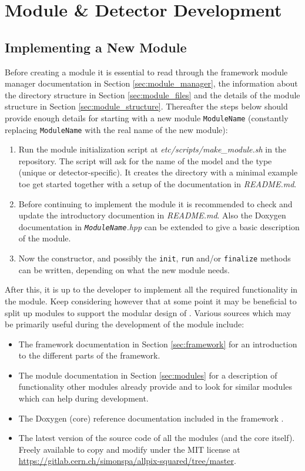 \section{Module \& Detector Development}
\subsection{Implementing a New Module}
\label{sec:building_new_module}

Before creating a module it is essential to read through the framework module manager documentation in Section \ref{sec:module_manager}, the information about the directory structure in Section \ref{sec:module_files} and the details of the module structure in Section \ref{sec:module_structure}. Thereafter the steps below should provide enough details for starting with a new module \texttt{ModuleName} (constantly replacing  \texttt{ModuleName} with the real name of the new module):
\begin{enumerate}
\item Run the module initialization script at \textit{etc/scripts/make\_module.sh} in the repository. The script will ask for the name of the model and the type (unique or detector-specific). It creates the directory with a minimal example toe get started together with a setup of the documentation in \textit{README.md}.
\item Before continuing to implement the module it is recommended to check and update the introductory documention in \textit{README.md}. Also the Doxygen documentation in \textit{\texttt{ModuleName}.hpp} can be extended to give a basic description of the module.
\item Now the constructor, and possibly the \texttt{init}, \texttt{run} and/or \texttt{finalize} methods can be written, depending on what the new module needs.
\end{enumerate}

After this, it is up to the developer to implement all the required functionality in the module. Keep considering however that at some point it may be beneficial to split up modules to support the modular design of \apsq. Various sources which may be primarily useful during the development of the module include:
\begin{itemize}
\item The framework documentation in Section \ref{sec:framework} for an introduction to the different parts of the framework.
\item The module documentation in Section \ref{sec:modules} for a description of functionality other modules already provide and to look for similar modules which can help during development.
\item The Doxygen (core) reference documentation included in the framework .
\item The latest version of the source code of all the modules (and the core itself). Freely available to copy and modify under the MIT license at \url{https://gitlab.cern.ch/simonspa/allpix-squared/tree/master}.
\end{itemize}

